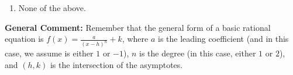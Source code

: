 \documentclass{extbook}[14pt]
\begin{document}
\begin{enumerate}
{\begin{enumerate}[label=\Alph*.]
\item None of the above.\end{enumerate}
\textbf{General Comment:} Remember that the general form of a basic rational equation is $ f(x) = \frac{a}{(x-h)^n} + k$, where $a$ is the leading coefficient (and in this case, we assume is either $1$ or $-1$), $n$ is the degree (in this case, either $1$ or $2$), and $(h, k)$ is the intersection of the asymptotes.
}
\end{enumerate}
\end{document}
